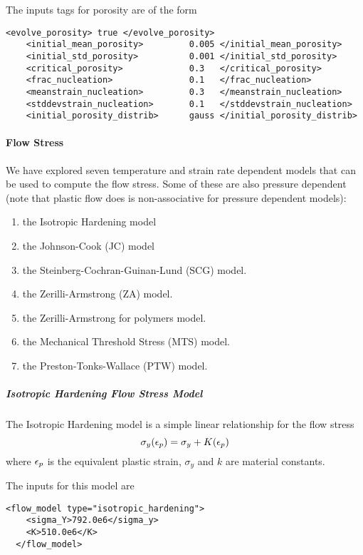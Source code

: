   The inputs tags for porosity are of the form
  \begin{Verbatim}[fontsize=\footnotesize]
    <evolve_porosity> true </evolve_porosity>
    <initial_mean_porosity>         0.005 </initial_mean_porosity>
    <initial_std_porosity>          0.001 </initial_std_porosity>
    <critical_porosity>             0.3   </critical_porosity>
    <frac_nucleation>               0.1   </frac_nucleation>
    <meanstrain_nucleation>         0.3   </meanstrain_nucleation>
    <stddevstrain_nucleation>       0.1   </stddevstrain_nucleation>
    <initial_porosity_distrib>      gauss </initial_porosity_distrib>
  \end{Verbatim}


\paragraph{Flow Stress}
  We have explored seven temperature and strain rate dependent
  models that can be used to compute the flow stress.  Some of these are also
  pressure dependent (note that plastic flow does is non-associative for
  pressure dependent models):
  \begin{enumerate}
    \item the Isotropic Hardening model
    \item the Johnson-Cook (JC) model
    \item the Steinberg-Cochran-Guinan-Lund (SCG) model.
    \item the Zerilli-Armstrong (ZA) model.
    \item the Zerilli-Armstrong for polymers model.
    \item the Mechanical Threshold Stress (MTS) model.
    \item the Preston-Tonks-Wallace (PTW) model.
  \end{enumerate}

  \subparagraph{Isotropic Hardening Flow Stress Model}
  The Isotropic Hardening model is a simple linear relationship for the flow stress
  \begin{equation}
    \sigma_y(\Ep) = \sigma_y + K (\Ep)
  \end{equation}
  where $\Ep$ is the equivalent plastic strain, $\sigma_y$ and $k$ are material constants.

  The inputs for this model are
  \begin{Verbatim}[fontsize=\footnotesize]
  <flow_model type="isotropic_hardening">
    <sigma_Y>792.0e6</sigma_y>
    <K>510.0e6</K>
  </flow_model>
  \end{Verbatim}

